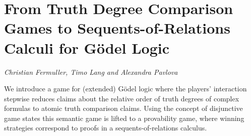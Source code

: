 \documentclass[../booklet.tex]{subfiles}
\begin{document}
\section[From Truth Degree Comparison Games to Sequents-of-Relations Calculi for Gödel Logic. {\it Christian Fermuller, Timo Lang and Alexandra Pavlova}]{From Truth Degree Comparison Games to Sequents-of-Relations Calculi for Gödel Logic}
  

\begin{center}
  {\it Christian Fermuller, Timo Lang and Alexandra Pavlova}
\end{center}

\vskip 0.8cm


We introduce a game for (extended) G\"odel logic where the players'
interaction stepwise reduces claims about the relative order 
of truth degrees of complex formulas to atomic truth comparison claims.
Using the concept of disjunctive game states this semantic game is
lifted to a provability game, where winning strategies correspond to
proofs in a sequents-of-relations calculus.
\end{document}
